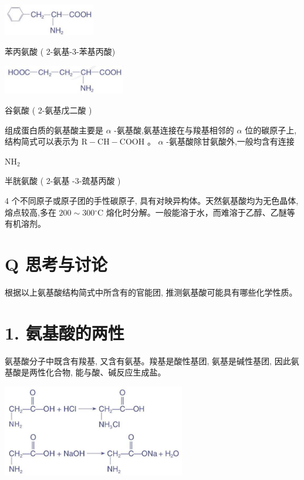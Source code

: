 \documentclass[10pt]{article}
\begin{document}
\begin{center}
\includegraphics[max width=0.3\textwidth]{images/0190efc5-b58a-7c43-bfb0-e0a030df9cfd_117_814763.jpg}
\end{center}

苯丙氨酸 ( 2-氨基-3-苯基丙酸)

\begin{center}
\includegraphics[max width=0.4\textwidth]{images/0190efc5-b58a-7c43-bfb0-e0a030df9cfd_117_695289.jpg}
\end{center}

谷氨酸 ( 2-氨基戊二酸 )

组成蛋白质的氨基酸主要是 \(\alpha\) -氨基酸,氨基连接在与羧基相邻的 \(\alpha\) 位的碳原子上,结构简式可以表示为 \(\mathrm{R} - \mathrm{{CH}} - \mathrm{{COOH}}\) 。 \(\alpha\) -氨基酸除甘氨酸外,一般均含有连接

\({\mathrm{{NH}}}_{2}\)

半胱氨酸 ( 2-氨基 -3-巯基丙酸 )

4 个不同原子或原子团的手性碳原子, 具有对映异构体。天然氨基酸均为无色晶体,熔点较高,多在 \({200} \sim {300}{}^{ \circ }\mathrm{C}\) 熔化时分解。一般能溶于水，而难溶于乙醇、乙醚等有机溶剂。

\section*{Q 思考与讨论}

根据以上氨基酸结构简式中所含有的官能团, 推测氨基酸可能具有哪些化学性质。

\section*{1. 氨基酸的两性}

氨基酸分子中既含有羧基, 又含有氨基。羧基是酸性基团, 氨基是碱性基团, 因此氨基酸是两性化合物, 能与酸、碱反应生成盐。

\begin{center}
\includegraphics[max width=0.6\textwidth]{images/0190efc5-b58a-7c43-bfb0-e0a030df9cfd_118_346271.jpg}
\end{center}
\end{document}
